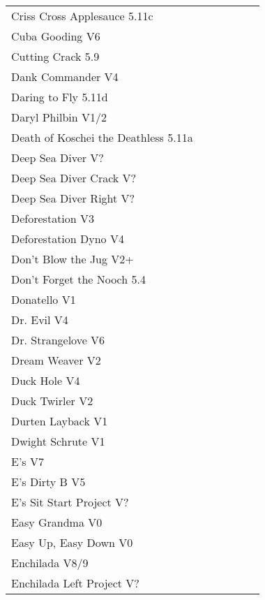 \begin{flushleft}
\begin{center}
\begin{supertabular}{p{0.76\linewidth}p{0.08\linewidth}}
Criss Cross Applesauce 5.11c & \pageref{rt:Criss Cross Applesauce} \\
Cuba Gooding V6 & \pageref{rt:Cuba Gooding} \\
Cutting Crack 5.9 & \pageref{rt:Cutting Crack} \\
Dank Commander V4 & \pageref{rt:Dank Commander} \\
Daring to Fly 5.11d & \pageref{rt:Daring to Fly} \\
Daryl Philbin V1/2 & \pageref{rt:Daryl Philbin} \\
Death of Koschei the Deathless 5.11a & \pageref{rt:Death of Koschei the Deathless} \\
Deep Sea Diver V? & \pageref{rt:Deep Sea Diver} \\
Deep Sea Diver Crack V? & \pageref{rt:DSD 3} \\
Deep Sea Diver Right V? & \pageref{rt:DSD 4} \\
Deforestation V3 & \pageref{rt:Deforestation} \\
Deforestation Dyno V4 & \pageref{vr:Deforestation Dyno} \\
Don't Blow the Jug V2+ & \pageref{rt:Don't Blow the Jug} \\
Don't Forget the Nooch 5.4 & \pageref{rt:Don't Forget the Nooch} \\
Donatello V1 & \pageref{rt:Donatello} \\
Dr. Evil V4 & \pageref{rt:Dr. Evil} \\
Dr. Strangelove V6 & \pageref{rt:Dr. Strangelove} \\
Dream Weaver V2 & \pageref{vr:Dream Weaver} \\
Duck Hole V4 & \pageref{rt:DT 1} \\
Duck Twirler V2 & \pageref{rt:Duck Twirler} \\
Durten Layback V1 & \pageref{rt:Durten Layback} \\
Dwight Schrute V1 & \pageref{rt:Dwight Schrute} \\
E's V7 & \pageref{rt:E's} \\
E's Dirty B V5 & \pageref{rt:E's Dirty B} \\
E's Sit Start Project V? & \pageref{vr:E's Sit Start Project} \\
Easy Grandma V0 & \pageref{rt:Easy Grandma} \\
Easy Up, Easy Down V0 & \pageref{rt:Easy Up, Easy Down} \\
Enchilada V8/9 & \pageref{rt:Enchilada} \\
Enchilada Left Project V? & \pageref{vr:Enchilada Left Project} \\

\end{supertabular}
\end{center}
\end{flushleft}
